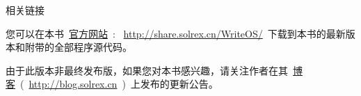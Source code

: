 \vspace{5ex}

\begin{lined}{\textwidth}\vspace{2ex}
\begin{center}
相关链接
\end{center}
\vspace{2ex}
\end{lined}

您可以在本书~\href{http://share.solrex.cn/WriteOS/}{官方网站}~: ~\url{http://share.solrex.cn/WriteOS/}~下载到本书的最新版本和附带的全部程序源代码。

由于此版本非最终发布版，如果您对本书感兴趣，请关注作者在其~\href{http://blog.solrex.cn/articles/category/cs/opensource/writeos}{博客}~(~\url{http://blog.solrex.cn}~)~上发布的更新公告。
